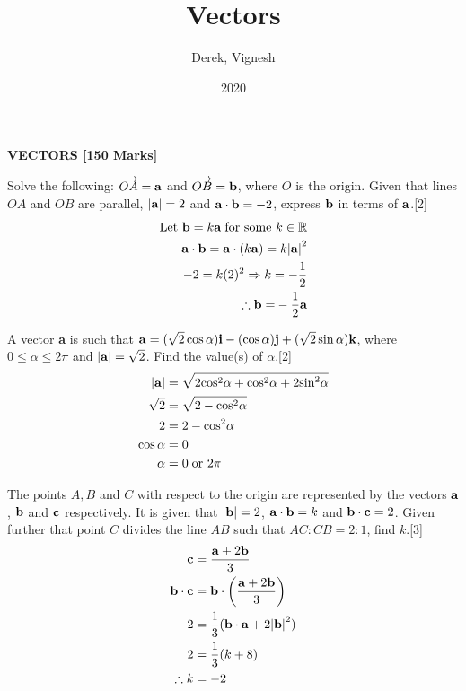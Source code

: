 \documentclass[12pt, a4 paper]{article}
\title{Vectors}
\author{Derek, Vignesh}
\date{2020}
\begin{document}
\maketitle
\textbf{VECTORS [150 Marks]}
\begin{outline}[enumerate]
	\1 Solve the following:
	\2 $\overrightarrow {OA}  = {\bf{a}}$ and $\overrightarrow {OB}  = {\bf{b}}$, where $O$ is the origin. Given that lines $OA$ and $OB$ are parallel, $\left| {\bf{a}} \right| = 2$ and ${\bf{a}} \cdot {\bf{b}} =  - 2$, express $\bf{b}$ in terms of $\bf{a}$.\hfill[2]
	\color{blue}
	\begin{align*}
		\textrm{Let } {\bf{b}} = k{\bf{a}}\;{\textrm{for some }}k \in \mathbb{R}            \\
		{\bf{a}} \cdot {\bf{b}} = {\bf{a}} \cdot (k{\bf{a}}) = k{\left| {\bf{a}} \right|^2} \\
		- 2 = k{(2)^2} \Rightarrow k =  - \frac{1}{2}                                       \\
		\therefore {\bf{b = }} - \frac{1}{2}{\bf{a}}
	\end{align*}

	\color{black}
	\2 A vector \textbf{a} is such that ${\bf{a}} = (\sqrt 2 \cos \alpha ){\bf{i}} - (\cos \alpha ){\bf{j}} + (\sqrt 2 \sin \alpha ){\bf{k}}$, where $0 \le \alpha  \le 2\pi $ and $\left| {\bf{a}} \right| = \sqrt 2 $. Find the value(s) of $\alpha $.\hfill[2]
	\color{blue}
	\begin{align*}
		\left| {\bf{a}} \right| & = \sqrt {2{{\cos }^2}\alpha  + {{\cos }^2}\alpha  + 2{{\sin }^2}\alpha } \\
		\sqrt 2                 & = \sqrt {2 - {{\cos }^2}\alpha }                                         \\
		2                       & = 2 - {\cos ^2}\alpha                                                    \\
		\cos \alpha             & = 0                                                                      \\
		\alpha                  & = 0\;{\textrm{or }}2\pi
	\end{align*}

	\color{black}
	\2 The points $A, B$ and $C$ with respect to the origin are represented by the vectors ${\bf{a}}$, ${\bf{b}}$ and ${\bf{c}}$ respectively. It is given that $\left| {\bf{b}} \right| = 2$, ${\bf{a}} \cdot {\bf{b}} = k$ and ${\bf{b}} \cdot {\bf{c}} = 2$. Given further that point $C$ divides the line $AB$ such that $AC:CB = 2:1$, find $k$.\hfill[3]
	\color{blue}
	\begin{align*}
		{\bf{c}}                & = \frac{{{\bf{a}} + 2{\bf{b}}}}{3}                                    \\
		{\bf{b}} \cdot {\bf{c}} & = {\bf{b}} \cdot \left( {\frac{{{\bf{a}} + 2{\bf{b}}}}{3}} \right)    \\
		2                       & = \frac{1}{3}({\bf{b}} \cdot {\bf{a}} + 2{\left| {\bf{b}} \right|^2}) \\
		2                       & = \frac{1}{3}(k + 8)                                                  \\
		\therefore k            & =  - 2
	\end{align*}


\end{outline}
\end{document}
